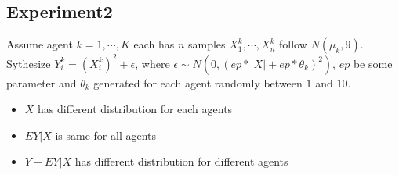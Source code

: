 \documentclass[12pt, a4paper, oneside]{article}
\begin{document}
\subsection{Experiment2}
    Assume agent $k=1,\cdots,K$ each has $n$ samples $X_1^k,\cdots,X_n^k$ follow $N(\mu_k,9)$. Sythesize $Y_i^k=(X_i^k)^2+\epsilon$, where $\epsilon\sim N(0,(ep*|X|+ep*\theta_k)^2)$, $ep$ be some parameter and $\theta_k$ generated for each agent randomly between $1$ and $10$.
    \begin{itemize}
        \item $X$ has different distribution for each agents
        \item $EY|X$ is same for all agents
        \item $Y-EY|X$ has different distribution for different agents
    \end{itemize}
\end{document}
